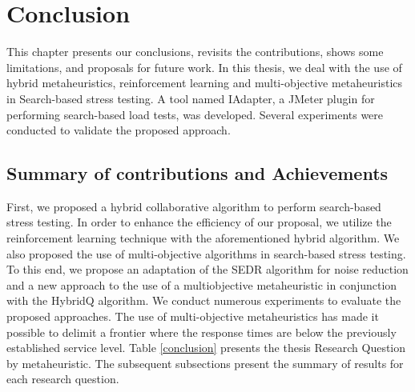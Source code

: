 \documentclass[espaco=umemeio,chapter=TITLE,twoside,openright]{abnt}
\begin{document}









%
%
%
\chapter{Conclusion}

This chapter presents our conclusions, revisits the contributions, shows some limitations, and proposals for future work. In this thesis, we deal with the use of hybrid metaheuristics, reinforcement learning and multi-objective metaheuristics in Search-based stress testing. A tool named IAdapter, a JMeter plugin for performing search-based load tests, was developed. Several experiments were conducted to validate the proposed approach.

\section{Summary of contributions and Achievements}

First, we proposed a hybrid collaborative algorithm to perform search-based stress testing. In order to enhance the efficiency of our proposal, we utilize the reinforcement learning technique with the aforementioned hybrid algorithm. We also proposed the use of multi-objective algorithms in search-based stress testing. To this end, we propose an adaptation of the SEDR algorithm for noise reduction and a new approach to the use of a multiobjective metaheuristic in conjunction with the HybridQ algorithm. We conduct numerous experiments to evaluate the proposed approaches. The use of multi-objective metaheuristics has made it possible to delimit a frontier where the response times are below the previously established service level. Table \ref{conclusion} presents the thesis Research Question by metaheuristic. The subsequent subsections present the summary of results for each research question.
\end{document}
